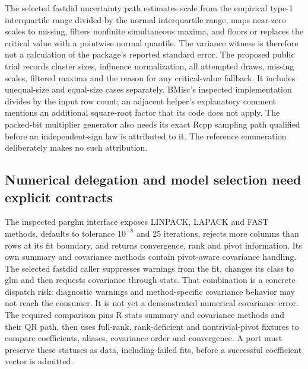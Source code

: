 The selected fastdid uncertainty path estimates scale from the empirical type-1 interquartile range divided by the normal interquartile range, maps near-zero scales to missing, filters nonfinite simultaneous maxima, and floors or replaces the critical value with a pointwise normal quantile. The variance witness is therefore not a calculation of the package's reported standard error. The proposed public trial records cluster sizes, influence normalization, all attempted draws, missing scales, filtered maxima and the reason for any critical-value fallback. It includes unequal-size and equal-size cases separately. BMisc's inspected implementation divides by the input row count; an adjacent helper's explanatory comment mentions an additional square-root factor that its code does not apply. The packed-bit multiplier generator also needs its exact Rcpp sampling path qualified before an independent-sign law is attributed to it. The reference enumeration deliberately makes no such attribution.\citep{exec28_panel_delegates,exec29_panel_inference_sources,exec29_panel_inference_reference}

\subsection{Numerical delegation and model selection need explicit contracts}

The inspected parglm interface exposes LINPACK, LAPACK and FAST methods, defaults to tolerance $10^{-8}$ and 25 iterations, rejects more columns than rows at its fit boundary, and returns convergence, rank and pivot information. Its own summary and covariance methods contain pivot-aware covariance handling. The selected fastdid caller suppresses warnings from the fit, changes its class to glm and then requests covariance through stats. That combination is a concrete dispatch risk: diagnostic warnings and method-specific covariance behavior may not reach the consumer. It is not yet a demonstrated numerical covariance error. The required comparison pins R stats summary and covariance methods and their QR path, then uses full-rank, rank-deficient and nontrivial-pivot fixtures to compare coefficients, aliases, covariance order and convergence. A port must preserve these statuses as data, including failed fits, before a successful coefficient vector is admitted.\citep{exec28_panel_estimator_sources,exec29_panel_inference_sources}

